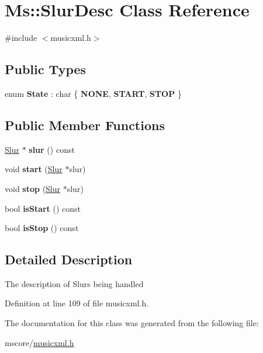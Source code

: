 \hypertarget{class_ms_1_1_slur_desc}{}\section{Ms\+:\+:Slur\+Desc Class Reference}
\label{class_ms_1_1_slur_desc}


{\ttfamily \#include $<$musicxml.\+h$>$}

\subsection*{Public Types}
\begin{DoxyCompactItemize}
\item 
\mbox{\label{class_ms_1_1_slur_desc_a4d110450f2513f8e19b0667c5f3936c5}} 
enum {\bfseries State} \+: char \{ {\bfseries N\+O\+NE}, 
{\bfseries S\+T\+A\+RT}, 
{\bfseries S\+T\+OP}
 \}
\end{DoxyCompactItemize}
\subsection*{Public Member Functions}
\begin{DoxyCompactItemize}
\item 
\mbox{\label{class_ms_1_1_slur_desc_ae7d0c0efd85fe682a19ee638fed44c51}} 
\hyperlink{class_ms_1_1_slur}{Slur} $\ast$ {\bfseries slur} () const
\item 
\mbox{\label{class_ms_1_1_slur_desc_afcbb216b3f9c76a0c9a1973c4fdc482a}} 
void {\bfseries start} (\hyperlink{class_ms_1_1_slur}{Slur} $\ast$slur)
\item 
\mbox{\label{class_ms_1_1_slur_desc_a23e8bf2d88187fc2dbd6c9728789f5bc}} 
void {\bfseries stop} (\hyperlink{class_ms_1_1_slur}{Slur} $\ast$slur)
\item 
\mbox{\label{class_ms_1_1_slur_desc_a357fd1453088e43c84940050cce2b876}} 
bool {\bfseries is\+Start} () const
\item 
\mbox{\label{class_ms_1_1_slur_desc_acbb2541ddeb43ea1e2e6238b08f6fa89}} 
bool {\bfseries is\+Stop} () const
\end{DoxyCompactItemize}


\subsection{Detailed Description}
The description of Slurs being handled 

Definition at line 109 of file musicxml.\+h.



The documentation for this class was generated from the following file\+:\begin{DoxyCompactItemize}
\item 
mscore/\hyperlink{musicxml_8h}{musicxml.\+h}\end{DoxyCompactItemize}
